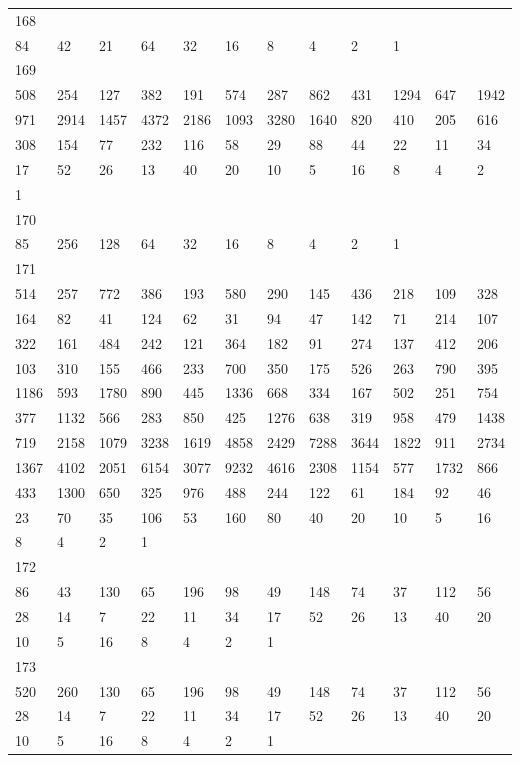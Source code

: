 \begin{longtable}{llllllllllll}
168&&&&&&&&&&&\\
84& 42& 21& 64& 32& 16& 8& 4& 2& 1& \\

169&&&&&&&&&&&\\
508& 254& 127& 382& 191& 574& 287& 862& 431& 1294& 647& 1942\\
971& 2914& 1457& 4372& 2186& 1093& 3280& 1640& 820& 410& 205& 616\\
308& 154& 77& 232& 116& 58& 29& 88& 44& 22& 11& 34\\
17& 52& 26& 13& 40& 20& 10& 5& 16& 8& 4& 2\\
1& \\

170&&&&&&&&&&&\\
85& 256& 128& 64& 32& 16& 8& 4& 2& 1& \\

171&&&&&&&&&&&\\
514& 257& 772& 386& 193& 580& 290& 145& 436& 218& 109& 328\\
164& 82& 41& 124& 62& 31& 94& 47& 142& 71& 214& 107\\
322& 161& 484& 242& 121& 364& 182& 91& 274& 137& 412& 206\\
103& 310& 155& 466& 233& 700& 350& 175& 526& 263& 790& 395\\
1186& 593& 1780& 890& 445& 1336& 668& 334& 167& 502& 251& 754\\
377& 1132& 566& 283& 850& 425& 1276& 638& 319& 958& 479& 1438\\
719& 2158& 1079& 3238& 1619& 4858& 2429& 7288& 3644& 1822& 911& 2734\\
1367& 4102& 2051& 6154& 3077& 9232& 4616& 2308& 1154& 577& 1732& 866\\
433& 1300& 650& 325& 976& 488& 244& 122& 61& 184& 92& 46\\
23& 70& 35& 106& 53& 160& 80& 40& 20& 10& 5& 16\\
8& 4& 2& 1& \\

172&&&&&&&&&&&\\
86& 43& 130& 65& 196& 98& 49& 148& 74& 37& 112& 56\\
28& 14& 7& 22& 11& 34& 17& 52& 26& 13& 40& 20\\
10& 5& 16& 8& 4& 2& 1& \\

173&&&&&&&&&&&\\
520& 260& 130& 65& 196& 98& 49& 148& 74& 37& 112& 56\\
28& 14& 7& 22& 11& 34& 17& 52& 26& 13& 40& 20\\
10& 5& 16& 8& 4& 2& 1& \\


\end{longtable}
